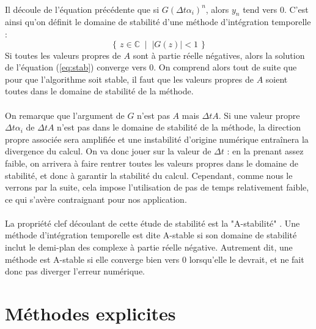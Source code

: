     \paragraph{}
    Il découle de l'équation précédente que si $G\left(\Delta t\alpha_i\right)^n$, alors $y_n$ tend vers 0.
    C'est ainsi qu'on définit le domaine de stabilité d'une méthode d'intégration temporelle :
    \[\left\{\,z\in\mathbb{C}\;\mid\;\left|G\left(z\right)\right| < 1\,\right\}\]
    Si toutes les valeurs propres de $A$ sont à partie réelle négatives, alors la solution de l'équation (\ref{eq:stab}) converge vers 0.
    On comprend alors tout de suite que pour que l'algorithme soit stable, il faut que les valeurs propres de $A$ soient toutes dans le domaine de stabilité de la méthode.

    \paragraph{}
    On remarque que l'argument de $G$ n'est pas $A$ mais $\Delta tA$.
    Si une valeur propre $\Delta t\alpha_i$ de $\Delta tA$ n'est pas dans le domaine de stabilité de la méthode, la direction propre associée sera amplifiée et une instabilité d'origine numérique entraînera la divergence du calcul.
    On va donc jouer sur la valeur de $\Delta t$ : en la prenant assez faible, on arrivera à faire rentrer toutes les valeurs propres dans le domaine de stabilité, et donc à garantir la stabilité du calcul.
    Cependant, comme nous le verrons par la suite, cela impose l'utilisation de pas de temps relativement faible, ce qui s'avère contraignant pour nos application.

    \paragraph{}
    La propriété clef découlant de cette étude de stabilité est la "A-stabilité" \cite{Dahlquist1963}.
    Une méthode d'intégration temporelle est dite A-stable si son domaine de stabilité inclut le demi-plan des complexe à partie réelle négative.
    Autrement dit, une méthode est A-stable si elle converge bien vers 0 lorsqu'elle le devrait, et ne fait donc pas diverger l'erreur numérique.


\section{Méthodes explicites}

